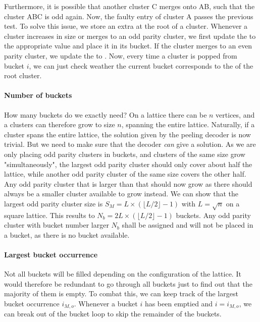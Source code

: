 Furthermore, it is possible that another cluster C merges onto AB, such that the cluster ABC is odd again. Now, the faulty entry of cluster A passes the previous test. To solve this issue, we store an extra  at the root of a cluster. Whenever a cluster increases in size or merges to an odd parity cluster, we first update the  to the appropriate value and place it in its bucket. If the cluster merges to an even parity cluster, we update the  to . Now, every time a cluster is popped from bucket $i$, we can just check weather the current bucket corresponds to the  of the root cluster.

\paragraph{Number of buckets}
How many buckets do we exactly need? On a lattice there can be $n$ vertices, and a clusters can therefore grow to size $n$, spanning the entire lattice. Naturally, if a cluster spans the entire lattice, the solution given by the peeling decoder is now trivial. But we need to make sure that the decoder \emph{can} give a solution. As we are only placing odd parity clusters in buckets, and clusters of the same size grow "simultaneously", the largest odd parity cluster should only cover about half the lattice, while another odd parity cluster of the same size covers the other half. Any odd parity cluster that is larger than that should now grow as there should always be a smaller cluster available to grow instead. We can show that the largest odd parity cluster size is $S_M = L\times(\lfloor L/2\rfloor - 1)$ with $L=\sqrt{n}$ on a square lattice. This results to $N_b = 2L\times(\lfloor L/2\rfloor - 1)$ buckets. Any odd parity cluster with bucket number larger $N_b$ shall be assigned  and will not be placed in a bucket, as there is no bucket available.

\paragraph{Largest bucket occurrence}
Not all buckets will be filled depending on the configuration of the lattice. It would therefore be redundant to go through all buckets just to find out that the majority of them is empty. To combat this, we can keep track of the largest bucket occurrence $i_{M,o}$. Whenever a bucket $i$ has been emptied and $i = i_{M,o}$, we can break out of the bucket loop to skip the remainder of the buckets.

